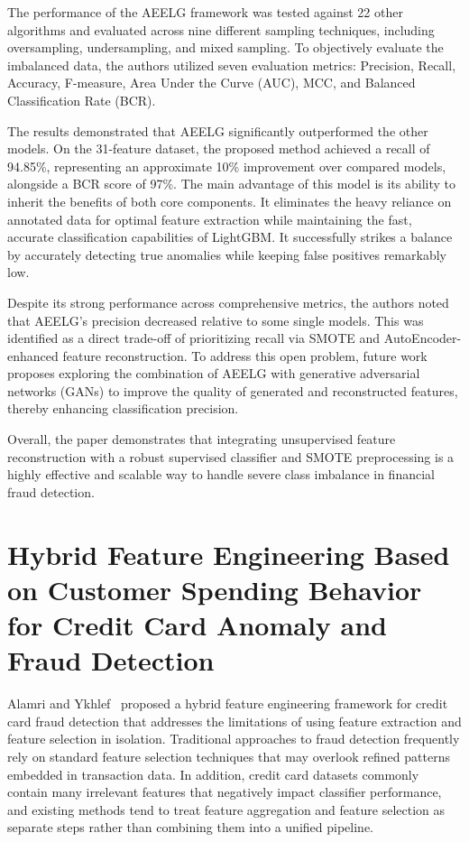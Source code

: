 \documentclass[12pt, a4paper]{report}
\begin{document}
The performance of the AEELG framework was tested against 22 other algorithms and evaluated across nine different sampling techniques, including oversampling, undersampling, and mixed sampling. To objectively evaluate the imbalanced data, the authors utilized seven evaluation metrics: Precision, Recall, Accuracy, F-measure, Area Under the Curve (AUC), MCC, and Balanced Classification Rate (BCR).

The results demonstrated that AEELG significantly outperformed the other models. On the 31-feature dataset, the proposed method achieved a recall of 94.85\%, representing an approximate 10\% improvement over compared models, alongside a BCR score of 97\%. The main advantage of this model is its ability to inherit the benefits of both core components. It eliminates the heavy reliance on annotated data for optimal feature extraction while maintaining the fast, accurate classification capabilities of LightGBM. It successfully strikes a balance by accurately detecting true anomalies while keeping false positives remarkably low.

Despite its strong performance across comprehensive metrics, the authors noted that AEELG's precision decreased relative to some single models. This was identified as a direct trade-off of prioritizing recall via SMOTE and AutoEncoder-enhanced feature reconstruction. To address this open problem, future work proposes exploring the combination of AEELG with generative adversarial networks (GANs) to improve the quality of generated and reconstructed features, thereby enhancing classification precision.

Overall, the paper demonstrates that integrating unsupervised feature reconstruction with a robust supervised classifier and SMOTE preprocessing is a highly effective and scalable way to handle severe class imbalance in financial fraud detection.


\section{Hybrid Feature Engineering Based on Customer Spending Behavior for Credit Card Anomaly and Fraud Detection}

Alamri and Ykhlef~\cite{alamri2024hybrid} proposed a hybrid feature engineering framework for credit card fraud detection that addresses the limitations of using feature extraction and feature selection in isolation. Traditional approaches to fraud detection frequently rely on standard feature selection techniques that may overlook refined patterns embedded in transaction data. In addition, credit card datasets commonly contain many irrelevant features that negatively impact classifier performance, and existing methods tend to treat feature aggregation and feature selection as separate steps rather than combining them into a unified pipeline.
\end{document}
